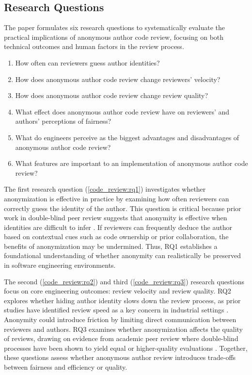 \subsection{Research Questions}
The paper formulates six research questions to systematically evaluate the practical implications of anonymous author code review, focusing on both technical outcomes and human factors in the review process.
\begin{enumerate}[leftmargin=*, label=\textbf{RQ (\arabic*)}]
    \item How often can reviewers guess author identities? \label{code_review:rq1}
    \item How does anonymous author code review change reviewers' velocity? \label{code_review:rq2}
    \item How does anonymous author code review change review quality? \label{code_review:rq3}
    \item What effect does anonymous author code review have on reviewers' and authors' perceptions of fairness? \label{code_review:rq4}
    \item What do engineers perceive as the biggest advantages and disadvantages of anonymous author code review? \label{code_review:rq5}
    \item What features are important to an implementation of anonymous author code review? \label{code_review:rq6}
\end{enumerate}

The first research question (\ref{code_review:rq1}) investigates whether anonymization is effective in practice by examining how often reviewers can correctly guess the identity of the author. This question is critical because prior work in double-blind peer review suggests that anonymity is effective when identities are difficult to infer \cite{ceci1984blind,goues2018effectiveness}. If reviewers can frequently deduce the author based on contextual cues such as code ownership or prior collaboration, the benefits of anonymization may be undermined. Thus, RQ1 establishes a foundational understanding of whether anonymity can realistically be preserved in software engineering environments.

The second (\ref{code_review:rq2}) and third (\ref{code_review:rq3}) research questions focus on core engineering outcomes: review velocity and review quality. RQ2 explores whether hiding author identity slows down the review process, as prior studies have identified review speed as a key concern in industrial settings \cite{sadowski2018modern}. Anonymity could introduce friction by limiting direct communication between reviewers and authors. RQ3 examines whether anonymization affects the quality of reviews, drawing on evidence from academic peer review where double-blind processes have been shown to yield equal or higher-quality evaluations \cite{alam2011blinded,fisher1994effects,justice1998does,vanrooyen1998effect}. Together, these questions assess whether anonymous author review introduces trade-offs between fairness and efficiency or quality.

